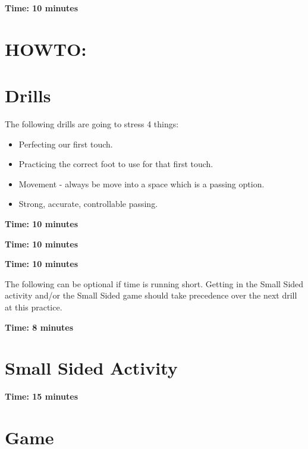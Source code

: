 \documentclass[10pt,letterpaper]{article}
\begin{document}
\textbf{Time: 10 minutes}


\section{HOWTO:}


\clearpage

\section{Drills}

The following drills are going to stress 4 things:
\begin{itemize}
    \setlength{\itemsep}{0pt}
    \setlength{\parskip}{0pt}
    \setlength{\parsep}{0pt}
    \item Perfecting our first touch.
    \item Practicing the correct foot to use for that first touch.
    \item Movement - always be move into a space which is a passing option.
    \item Strong, accurate, controllable passing.
\end{itemize}

\textbf{Time: 10 minutes}


\textbf{Time: 10 minutes}


\clearpage

\textbf{Time: 10 minutes}


The following can be optional if time is running short.  Getting in the Small Sided activity and/or the Small Sided game should take precedence over the next drill at this practice.

\textbf{Time: 8 minutes}



\clearpage

\section{Small Sided Activity}
\textbf{Time: 15 minutes}


\section{Game}
\end{document}

